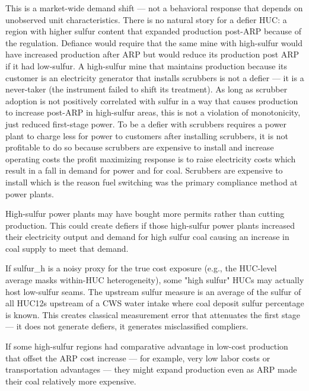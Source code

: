 \documentclass{article}
\begin{document}
This is a market-wide demand shift — not a behavioral response that depends on unobserved unit characteristics. There is no natural story for a defier HUC: a region with higher sulfur content that expanded production post-ARP because of the regulation. Defiance would require that the same mine with high-sulfur would have increased production after ARP but would reduce its production post ARP if it had low-sulfur. A high-sulfur mine that maintains production because its customer is an electricity generator that installs scrubbers is not a defier — it is a never-taker (the instrument failed to shift its treatment). As long as scrubber adoption is not positively correlated with sulfur in a way that causes production to increase post-ARP in high-sulfur areas, this is not a violation of monotonicity, just reduced first-stage power. To be a defier with scrubbers requires a power plant to charge less for power to customers after installing scrubbers, it is not profitable to do so because scrubbers are expensive to install and increase operating costs the profit maximizing response is to raise electricity costs which result in a fall in demand for power and for coal. Scrubbers are expensive to install which is the reason fuel switching was the primary compliance method at power plants.

High-sulfur power plants may have bought more permits rather than cutting production. This could create defiers if those high-sulfur power plants increased their electricity output and demand for high sulfur coal causing an increase in coal supply to meet that demand.

If sulfur_h is a noisy proxy for the true cost exposure (e.g., the HUC-level average masks within-HUC heterogeneity), some "high sulfur" HUCs may actually host low-sulfur seams. The upstream sulfur measure is an average of the sulfur of all HUC12s upstream of a CWS water intake where coal deposit sulfur percentage is known. This creates classical measurement error that attenuates the first stage — it does not generate defiers, it generates misclassified compliers.

If some high-sulfur regions had comparative advantage in low-cost production that offset the ARP cost increase — for example, very low labor costs or transportation advantages — they might expand production even as ARP made their coal relatively more expensive.
\end{document}
